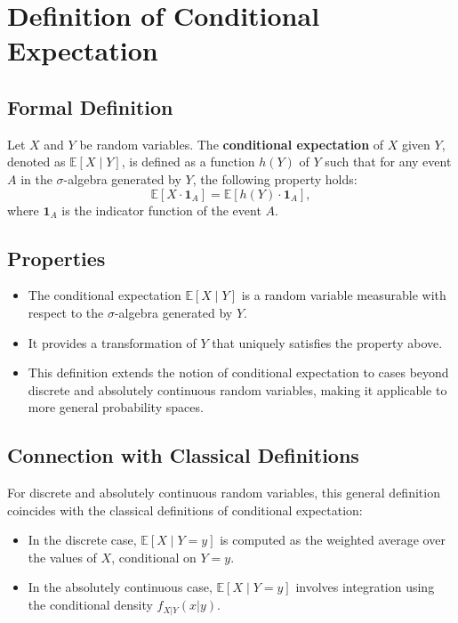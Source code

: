 \section{Definition of Conditional Expectation}

\subsection{Formal Definition}
Let \( X \) and \( Y \) be random variables. The \textbf{conditional expectation} of \( X \) given \( Y \), denoted as \( \mathbb{E}[X \mid Y] \), is defined as a function \( h(Y) \) of \( Y \) such that for any event \( A \) in the \(\sigma\)-algebra generated by \( Y \), the following property holds:
\[
\mathbb{E}[X \cdot \mathbf{1}_A] = \mathbb{E}[h(Y) \cdot \mathbf{1}_A],
\]
where \( \mathbf{1}_A \) is the indicator function of the event \( A \).

\subsection{Properties}
\begin{itemize}
    \item The conditional expectation \( \mathbb{E}[X \mid Y] \) is a random variable measurable with respect to the \(\sigma\)-algebra generated by \( Y \).
    \item It provides a transformation of \( Y \) that uniquely satisfies the property above.
    \item This definition extends the notion of conditional expectation to cases beyond discrete and absolutely continuous random variables, making it applicable to more general probability spaces.
\end{itemize}

\subsection{Connection with Classical Definitions}
For discrete and absolutely continuous random variables, this general definition coincides with the classical definitions of conditional expectation:
\begin{itemize}
    \item In the discrete case, \( \mathbb{E}[X \mid Y=y] \) is computed as the weighted average over the values of \( X \), conditional on \( Y=y \).
    \item In the absolutely continuous case, \( \mathbb{E}[X \mid Y=y] \) involves integration using the conditional density \( f_{X|Y}(x|y) \).
\end{itemize}

